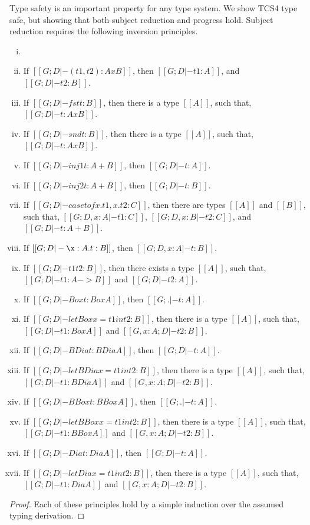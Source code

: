 Type safety is an important property for any type system.  We show
TCS4 type safe, but showing that both subject reduction and progress
hold.  Subject reduction requires the following inversion principles.
\begin{lemma}[Inversion]
  \label{lemma:inversion}
  \begin{enumerate}[i.]
  \item[]
  \item If $[[G; D |- (t1, t2) : A x B]]$, then $[[G;D |- t1 : A]]$, and $[[G;D |- t2 : B]]$.
  \item If $[[G; D |- fst t : B]]$, then there is a type $[[A]]$, such that, $[[G; D |- t : A x B]]$.
  \item If $[[G; D |- snd t : B]]$, then there is a type $[[A]]$, such that, $[[G; D |- t : A x B]]$.
  \item If $[[G; D |- inj1 t : A + B]]$, then $[[G; D |- t : A]]$.
  \item If $[[G; D |- inj2 t : A + B]]$, then $[[G; D |- t : B]]$.
  \item If $[[G; D |- case t of x.t1,x.t2 : C]]$, then there are types $[[A]]$ and $[[B]]$,
    such that, $[[G;D, x : A |- t1 : C]]$, $[[G;D, x : B |- t2 : C]]$, and $[[G;D |- t : A + B]]$.
  \item If $[[G;D |- \x:A.t : B]]$, then $[[G;D,x : A |- t : B]]$.    
  \item If $[[G;D |- t1 t2 : B]]$, then there exists a type $[[A]]$, such that, $[[G;D |- t1 : A -> B]]$ and $[[G;D |- t2 : A]]$.
  \item If $[[G;D |- Box t : Box A]]$, then $[[G;. |- t : A]]$.
  \item If $[[G;D |- letBox x = t1 in t2 : B]]$, then there is a type $[[A]]$, such that,
    $[[G;D |- t1 : Box A]]$ and $[[G,x : A;D |- t2 : B]]$.
  \item If $[[G;D |- BDia t : BDia A]]$, then $[[G;D |- t : A]]$.
  \item If $[[G;D |- letBDia x = t1 in t2 : B]]$, then there is a type $[[A]]$, such that,
    $[[G;D |- t1 : BDia A]]$ and $[[G,x : A;D |- t2 : B]]$.
  \item If $[[G;D |- BBox t : BBox A]]$, then $[[G;. |- t : A]]$.
  \item If $[[G;D |- letBBox x = t1 in t2 : B]]$, then there is a type $[[A]]$, such that,
    $[[G;D |- t1 : BBox A]]$ and $[[G,x : A;D |- t2 : B]]$.
  \item If $[[G;D |- Dia t : Dia A]]$, then $[[G;D |- t : A]]$.
  \item If $[[G;D |- letDia x = t1 in t2 : B]]$, then there is a type $[[A]]$, such that,
    $[[G;D |- t1 : Dia A]]$ and $[[G,x : A;D |- t2 : B]]$.
  \end{enumerate}
\end{lemma}
\begin{proof}
  Each of these principles hold by a simple induction over the assumed
  typing derivation.
\end{proof}

